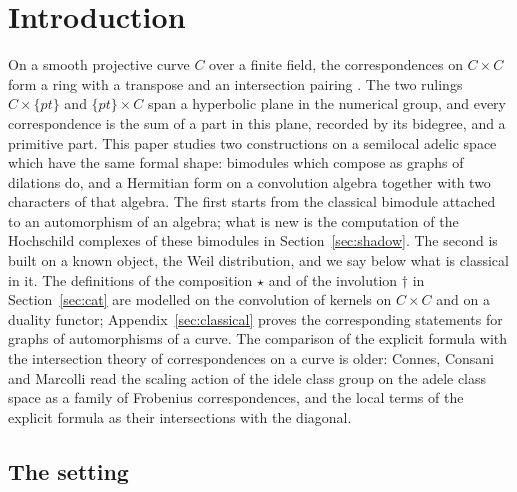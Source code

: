 \documentclass[11pt]{amsart}
\theoremstyle{definition}
\theoremstyle{remark}
\begin{document}
\setcounter{tocdepth}{1}
\tableofcontents

\section{Introduction}\label{sec:intro}

On a smooth projective curve $C$ over a finite field, the correspondences on
$C\times C$ form a ring with a transpose and an intersection pairing
\cite{Weil1948}.  The two rulings $C\times\{pt\}$ and $\{pt\}\times C$ span a
hyperbolic plane in the numerical group, and every correspondence is the sum
of a part in this plane, recorded by its bidegree, and a primitive part.
This paper studies two constructions on a semilocal adelic space which have
the same formal shape: bimodules which compose as graphs of dilations do, and
a Hermitian form on a convolution algebra together with two characters of
that algebra.  The first starts from the classical bimodule attached to an
automorphism of an algebra; what is new is the computation of the Hochschild
complexes of these bimodules in Section~\ref{sec:shadow}.  The second is built on a known object, the
Weil distribution, and we say below what is classical in it.  The definitions
of the composition $\star$ and of the involution $\dagger$ in
Section~\ref{sec:cat} are modelled on the convolution of kernels on
$C\times C$ and on a duality functor; Appendix~\ref{sec:classical} proves the
corresponding statements for graphs of automorphisms of a curve.  The
comparison of the explicit formula with the intersection theory of
correspondences on a curve is older: Connes, Consani and Marcolli
\cite[Section~7.1]{CCM} read the scaling action of the idele class group on
the adele class space as a family of Frobenius correspondences, and the
local terms of the explicit formula as their intersections with the
diagonal.

\subsection*{The setting}
\end{document}
